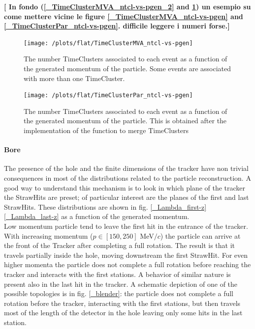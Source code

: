 \documentclass[12pt,a4paper,openright, oneside, titlepage]{book} %
\begin{document}
\textbf{[ In fondo (\ref{_TimeClusterMVA_ntcl-vs-pgen_2} and \ref{_TimeClusterPar_ntcl-vs-pgen_2}) un esempio su come mettere vicine le figure \ref{_TimeClusterMVA_ntcl-vs-pgen} and \ref{_TimeClusterPar_ntcl-vs-pgen}. difficile leggere i numeri forse.]}

\begin{figure}[!htb]
    \centering
    \begin{minipage}{.49\textwidth}
		\centering
		\texttt{[image: /plots/flat/TimeClusterMVA\_ntcl-vs-pgen]}
		\caption{The number TimeClusters associated to each event as a function of the generated momentum of the particle. Some events are associated with more than one TimeCluster.}
		\label{_TimeClusterMVA_ntcl-vs-pgen_2}
	\end{minipage}
	\hfill
    \begin{minipage}{0.49\textwidth}
    	\centering
    	\texttt{[image: /plots/flat/TimeClusterPar\_ntcl-vs-pgen]}
		\caption{The number TimeClusters associated to each event as a function of the generated momentum of the particle. This is obtained after the implementation of the function to merge TimeClusters}
		\label{_TimeClusterPar_ntcl-vs-pgen_2}
	\end{minipage}
\end{figure}

\paragraph{Bore} The presence of the hole and the finite dimensions of the tracker have non trivial consequences in most of the distributions related to the particle reconstruction.
A good way to understand this mechanism is to look in which plane of the tracker the StrawHits are preset; of particular interest are the planes of the first and last StrawHits. 
These distributions are shown in fig. \ref{_Lambda_first-z} \ref{_Lambda_last-z} as a function of the generated momentum.\\
Low momentum particle tend to leave the first hit in the entrance of the tracker. 
With increasing momentum ($p \in [150,250]$ MeV$/c$) the particle can arrive at the front of the Tracker after completing  a full rotation. The result is that it travels partially inside the hole, moving downstream the first StrawHit.
For even higher momenta the particle does not complete a full rotation before reaching the tracker and interacts with the first stations.
A behavior of similar nature is present also in the last hit in the tracker. 
A schematic depiction of one of the possible topologies is in fig. \ref{_blender}: the particle does not complete a full rotation before the tracker, interacting with the first stations, but then travels most of the length of the detector in the hole leaving only some hits in the last station.
\end{document}
